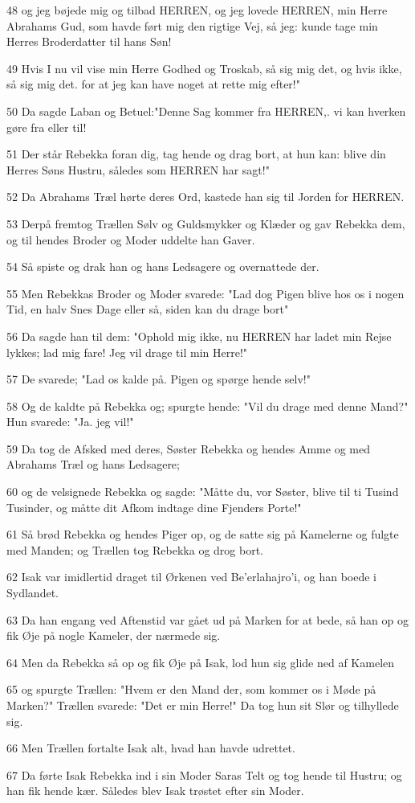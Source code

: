 \par 48 og jeg bøjede mig og tilbad HERREN, og jeg lovede HERREN, min Herre Abrahams Gud, som havde ført mig den rigtige Vej, så jeg: kunde tage min Herres Broderdatter til hans Søn!
\par 49 Hvis I nu vil vise min Herre Godhed og Troskab, så sig mig det, og hvis ikke, så sig mig det. for at jeg kan have noget at rette mig efter!"
\par 50 Da sagde Laban og Betuel:"Denne Sag kommer fra HERREN,. vi kan hverken gøre fra eller til!
\par 51 Der står Rebekka foran dig, tag hende og drag bort, at hun kan: blive din Herres Søns Hustru, således som HERREN har sagt!"
\par 52 Da Abrahams Træl hørte deres Ord, kastede han sig til Jorden for HERREN.
\par 53 Derpå fremtog Trællen Sølv og Guldsmykker og Klæder og gav Rebekka dem, og til hendes Broder og Moder uddelte han Gaver.
\par 54 Så spiste og drak han og hans Ledsagere og overnattede der.
\par 55 Men Rebekkas Broder og Moder svarede: "Lad dog Pigen blive hos os i nogen Tid, en halv Snes Dage eller så, siden kan du drage bort"
\par 56 Da sagde han til dem: "Ophold mig ikke, nu HERREN har ladet min Rejse lykkes; lad mig fare! Jeg vil drage til min Herre!"
\par 57 De svarede; "Lad os kalde på. Pigen og spørge hende selv!"
\par 58 Og de kaldte på Rebekka og; spurgte hende: "Vil du drage med denne Mand?" Hun svarede: "Ja. jeg vil!"
\par 59 Da tog de Afsked med deres, Søster Rebekka og hendes Amme og med Abrahams Træl og hans Ledsagere;
\par 60 og de velsignede Rebekka og sagde: "Måtte du, vor Søster, blive til ti Tusind Tusinder, og måtte dit Afkom indtage dine Fjenders Porte!"
\par 61 Så brød Rebekka og hendes Piger op, og de satte sig på Kamelerne og fulgte med Manden; og Trællen tog Rebekka og drog bort.
\par 62 Isak var imidlertid draget til Ørkenen ved Be'erlahajro'i, og han boede i Sydlandet.
\par 63 Da han engang ved Aftenstid var gået ud på Marken for at bede, så han op og fik Øje på nogle Kameler, der nærmede sig.
\par 64 Men da Rebekka så op og fik Øje på Isak, lod hun sig glide ned af Kamelen
\par 65 og spurgte Trællen: "Hvem er den Mand der, som kommer os i Møde på Marken?" Trællen svarede: "Det er min Herre!" Da tog hun sit Slør og tilhyllede sig.
\par 66 Men Trællen fortalte Isak alt, hvad han havde udrettet.
\par 67 Da førte Isak Rebekka ind i sin Moder Saras Telt og tog hende til Hustru; og han fik hende kær. Således blev Isak trøstet efter sin Moder.

